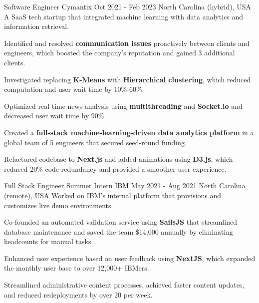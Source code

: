 \begin{cventries}
    \cventry
    {Software Engineer} %
    {Cymantix} %
    {Oct 2021 - Feb 2023} %
    {North Carolina (hybrid), USA} %
    {A SaaS tech startup that integrated machine learning with data analytics and information retrieval.}
    {
      \begin{cvitems} %
        \item {Identified and resolved \textbf{communication issues} proactively between clients and engineers, which boosted the company's reputation and gained 3 additional clients.}
        \item {Investigated replacing \textbf{K-Means} with \textbf{Hierarchical clustering}, which reduced computation and user wait time by 10\%-60\%.}
        \item {Optimized real-time news analysis using \textbf{multithreading} and \textbf{Socket.io} and decreased user wait time by 90\%.}
        \item {Created a \textbf{full-stack machine-learning-driven data analytics platform} in a global team of 5 engineers that secured seed-round funding.}
        \item {Refactored codebase to \textbf{Next.js} and added animations using \textbf{D3.js}, which reduced 20\% code redundancy and provided a smoother user experience.}
      \end{cvitems}
    }

    \cventry
    {Full Stack Engineer Summer Intern} %
    {IBM} %
    {May 2021 - Aug 2021} %
    {North Carolina (remote), USA} %
    {Worked on IBM's internal platform that provisions and customizes live demo environments.}
    {
      \begin{cvitems} %
        \item {Co-founded an automated validation service using \textbf{SailsJS} that streamlined database maintenance and saved the team \$14,000 annually by eliminating headcounts for manual tasks.}
        \item {Enhanced user experience based on user feedback using \textbf{NextJS}, which expanded the monthly user base to over 12,000+ IBMers.}
        \item {Streamlined administrative content processes, achieved faster content updates, and reduced redeployments by over 20 per week.}
      \end{cvitems}
    }


\end{cventries}
